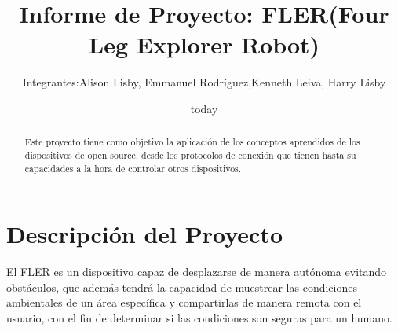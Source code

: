 \documentclass[12pt,letterpaper]{IEEEtran}
\title{Informe de Proyecto: FLER(Four Leg Explorer Robot) }
\author{Integrantes:Alison Lisby, Emmanuel Rodríguez,Kenneth Leiva, Harry Lisby}
\date {today}
\begin{document}
\maketitle 
\renewcommand{\leftmark}{UNIVERSIDAD LATINA DE COSTA RICA -- BINGE-61 Microcontroladores}

\begin{abstract}
Este proyecto tiene como objetivo la aplicación de los conceptos aprendidos de los dispositivos de open source, desde  los protocolos de conexión que tienen hasta su capacidades a la hora de controlar otros dispositivos.
		
\end{abstract}

\section{Descripción del Proyecto}
El FLER es un dispositivo capaz de desplazarse de manera autónoma evitando obstáculos, que además tendrá la capacidad de muestrear las condiciones ambientales de un área específica y compartirlas de manera remota con el usuario, con el fin de determinar si las condiciones son seguras para un humano.



 
\end{document}
